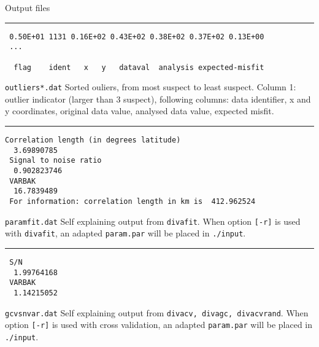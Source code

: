 \documentclass[8pt,a4paper,notitlepage]{book}
\begin{document}
\pagebreak
\clearpage
{\Huge{Output files}}
\begin{multicols}{2}
\thispagestyle{empty}


\begin{minipage}{9cm}
\rule{\textwidth}{10pt}
{\scriptsize{
\begin{verbatim}
 0.50E+01 1131 0.16E+02 0.43E+02 0.38E+02 0.37E+02 0.13E+00
 ...
 
  flag    ident   x   y   dataval  analysis expected-misfit
\end{verbatim}
}}
\makebox[\textwidth]{\hrulefill}
{{\tt outliers*.dat} Sorted ouliers, from most suspect to least suspect. Column 1: outlier indicator (larger than 3 suspect), following columns: data identifier, x and y coordinates, original data value, analysed data value, expected misfit.}
\end{minipage}

\begin{minipage}{9cm}
\rule{\textwidth}{10pt}
{\scriptsize{
\begin{verbatim}
Correlation length (in degrees latitude)
  3.69890785
 Signal to noise ratio
  0.902823746
 VARBAK
  16.7839489
 For information: correlation length in km is  412.962524
\end{verbatim}
}}
\makebox[\textwidth]{\hrulefill}
{{\tt paramfit.dat} Self explaining output from {\tt divafit}. When option {\tt [-r]} is used with {\tt divafit}, an adapted {\tt param.par} will be placed in {\tt ./input}.}
\end{minipage}

\begin{minipage}{9cm}
\rule{\textwidth}{10pt}
{\scriptsize{
\begin{verbatim}
 S/N
  1.99764168
 VARBAK
  1.14215052
\end{verbatim}
}}
\makebox[\textwidth]{\hrulefill}
{{\tt gcvsnvar.dat} Self explaining output from {\tt divacv, divagc, divacvrand}. When option {\tt [-r]} is used with cross validation, an adapted {\tt param.par} will be placed in {\tt ./input}}.
\end{minipage}

\end{multicols}
\end{document}
